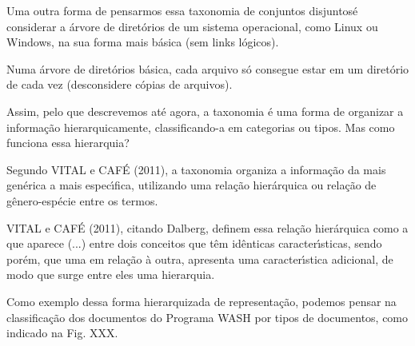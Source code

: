 \documentclass[
12pt,		%
openright,	%
twoside,  %
a4paper,			%
chapter=TITLE,		%
english,			%
french,				%
spanish,			%
brazil				%
]{USPSC-classe/USPSC}
\begin{document}
Uma outra forma de pensarmos essa \textquotedbl taxonomia de conjuntos disjuntos\textquotedbl  \'e considerar a \'arvore de diret\'orios de um sistema operacional, como Linux ou Windows, na sua forma mais b\'asica (sem links l\'ogicos).




Numa \'arvore de diret\'orios b\'asica, cada arquivo s\'o consegue estar em um diret\'orio de cada vez (desconsidere c\'opias de arquivos).




Assim, pelo que descrevemos at\'e agora, a taxonomia \'e uma forma de organizar a informa\c{c}\~ao hierarquicamente, classificando-a em categorias ou tipos. Mas como funciona essa hierarquia?




Segundo  VITAL e CAF\'E (2011), \textquotedbl a taxonomia organiza a informa\c{c}\~ao da mais gen\'erica a mais espec\'{\i}fica, utilizando uma rela\c{c}\~ao hier\'arquica ou rela\c{c}\~ao de g\^enero-esp\'ecie entre os termos\textquotedbl .




 VITAL e CAF\'E (2011), citando Dalberg, definem essa rela\c{c}\~ao hier\'arquica como a que aparece \textquotedbl (...) entre dois conceitos que t\^em id\^enticas caracter\'{\i}sticas, sendo por\'em, que uma em rela\c{c}\~ao \`a outra, apresenta uma caracter\'{\i}stica adicional, de modo que surge entre eles uma hierarquia\textquotedbl .




Como exemplo dessa forma hierarquizada de representa\c{c}\~ao, podemos pensar na classifica\c{c}\~ao dos documentos do Programa WASH por tipos de documentos, como indicado na Fig. XXX.
\end{document}
